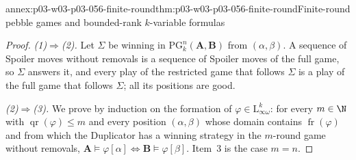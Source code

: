 \begin{annexitem}{annex:p03-w03-p03-056-finite-round}{thm:p03-w03-p03-056-finite-round}{Finite-round pebble games and bounded-rank \(k\)-variable formulas}
\begin{proof}
\emph{(1)\(\Rightarrow\)(2).} Let \(\Sigma\) be winning in
\(\mathrm{PG}^n_k(\mathbf A,\mathbf B)\) from \((\alpha,\beta)\). A sequence
of Spoiler moves without removals is a sequence of Spoiler moves of the full
game, so \(\Sigma\) answers it, and every play of the restricted game that
follows \(\Sigma\) is a play of the full game that follows \(\Sigma\); all
its positions are good.

\emph{(2)\(\Rightarrow\)(3).} We prove by induction on the formation of
\(\varphi\in\mathrm{L}^k_{\infty\omega}\): for every \(m\in\N\) with
\(\operatorname{qr}(\varphi)\leq m\) and every position \((\alpha,\beta)\)
whose domain contains \(\operatorname{fr}(\varphi)\) and from which the
Duplicator has a winning strategy in the \(m\)-round game without removals,
\(\mathbf A\models\varphi[\alpha]\iff\mathbf B\models\varphi[\beta]\). Item~3
is the case \(m=n\).


\end{proof}
\end{annexitem}
